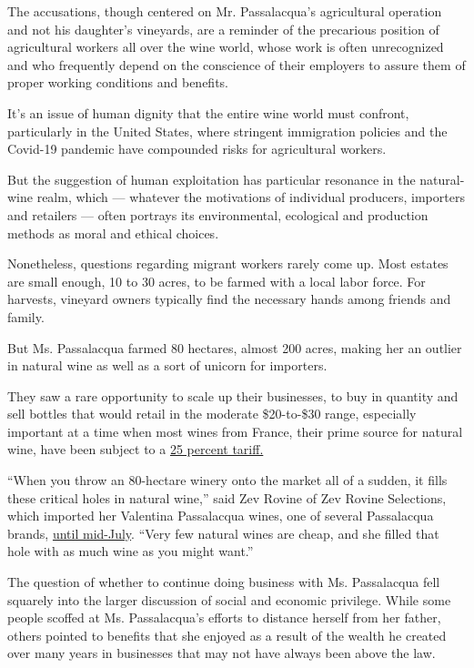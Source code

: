 The accusations, though centered on Mr. Passalacqua's agricultural
operation and not his daughter's vineyards, are a reminder of the
precarious position of agricultural workers all over the wine world,
whose work is often unrecognized and who frequently depend on the
conscience of their employers to assure them of proper working
conditions and benefits.

It's an issue of human dignity that the entire wine world must confront,
particularly in the United States, where stringent immigration policies
and the Covid-19 pandemic have compounded risks for agricultural
workers.

But the suggestion of human exploitation has particular resonance in the
natural-wine realm, which --- whatever the motivations of individual
producers, importers and retailers --- often portrays its environmental,
ecological and production methods as moral and ethical choices.

Nonetheless, questions regarding migrant workers rarely come up. Most
estates are small enough, 10 to 30 acres, to be farmed with a local
labor force. For harvests, vineyard owners typically find the necessary
hands among friends and family.

But Ms. Passalacqua farmed 80 hectares, almost 200 acres, making her an
outlier in natural wine as well as a sort of unicorn for importers.

They saw a rare opportunity to scale up their businesses, to buy in
quantity and sell bottles that would retail in the moderate \$20-to-\$30
range, especially important at a time when most wines from France, their
prime source for natural wine, have been subject to a
\href{https://www.nytimes3xbfgragh.onion/2019/10/08/dining/trump-tariffs-wine.html}{25
percent tariff.}

``When you throw an 80-hectare winery onto the market all of a sudden,
it fills these critical holes in natural wine,'' said Zev Rovine of Zev
Rovine Selections, which imported her Valentina Passalacqua wines, one
of several Passalacqua brands,
\href{https://zrswines.com/wine-producer/valentina-passlacqua/}{until
mid-July}. ``Very few natural wines are cheap, and she filled that hole
with as much wine as you might want.''

The question of whether to continue doing business with Ms. Passalacqua
fell squarely into the larger discussion of social and economic
privilege. While some people scoffed at Ms. Passalacqua's efforts to
distance herself from her father, others pointed to benefits that she
enjoyed as a result of the wealth he created over many years in
businesses that may not have always been above the law.

